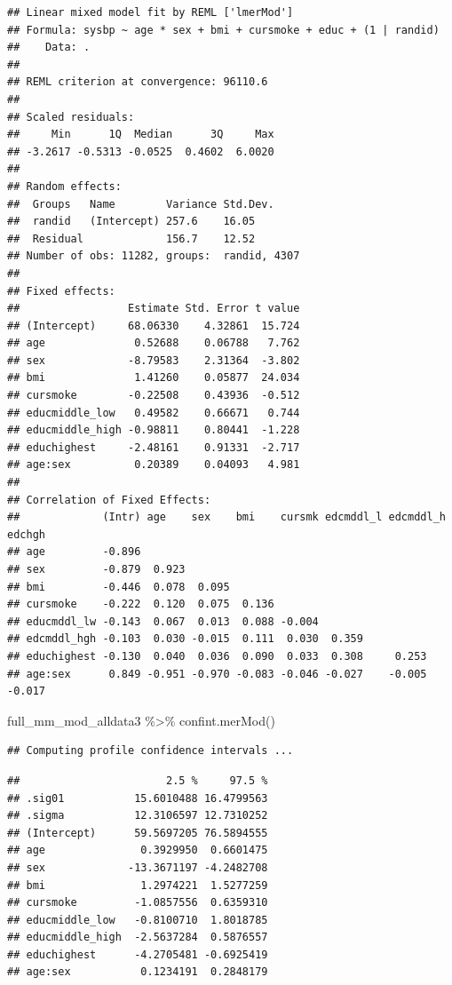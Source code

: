 \documentclass[
]{book}
\newenvironment{Shaded}{\begin{snugshade}}{\end{snugshade}}
\newcommand{\FunctionTok}[1]{\textcolor[rgb]{0.00,0.00,0.00}{#1}}
\newcommand{\NormalTok}[1]{#1}
\newcommand{\SpecialCharTok}[1]{\textcolor[rgb]{0.00,0.00,0.00}{#1}}
\begin{document}
\begin{verbatim}
## Linear mixed model fit by REML ['lmerMod']
## Formula: sysbp ~ age * sex + bmi + cursmoke + educ + (1 | randid)
##    Data: .
## 
## REML criterion at convergence: 96110.6
## 
## Scaled residuals: 
##     Min      1Q  Median      3Q     Max 
## -3.2617 -0.5313 -0.0525  0.4602  6.0020 
## 
## Random effects:
##  Groups   Name        Variance Std.Dev.
##  randid   (Intercept) 257.6    16.05   
##  Residual             156.7    12.52   
## Number of obs: 11282, groups:  randid, 4307
## 
## Fixed effects:
##                 Estimate Std. Error t value
## (Intercept)     68.06330    4.32861  15.724
## age              0.52688    0.06788   7.762
## sex             -8.79583    2.31364  -3.802
## bmi              1.41260    0.05877  24.034
## cursmoke        -0.22508    0.43936  -0.512
## educmiddle_low   0.49582    0.66671   0.744
## educmiddle_high -0.98811    0.80441  -1.228
## educhighest     -2.48161    0.91331  -2.717
## age:sex          0.20389    0.04093   4.981
## 
## Correlation of Fixed Effects:
##             (Intr) age    sex    bmi    cursmk edcmddl_l edcmddl_h edchgh
## age         -0.896                                                       
## sex         -0.879  0.923                                                
## bmi         -0.446  0.078  0.095                                         
## cursmoke    -0.222  0.120  0.075  0.136                                  
## educmddl_lw -0.143  0.067  0.013  0.088 -0.004                           
## edcmddl_hgh -0.103  0.030 -0.015  0.111  0.030  0.359                    
## educhighest -0.130  0.040  0.036  0.090  0.033  0.308     0.253          
## age:sex      0.849 -0.951 -0.970 -0.083 -0.046 -0.027    -0.005    -0.017
\end{verbatim}

\begin{Shaded}
\begin{Highlighting}[]
\NormalTok{full\_mm\_mod\_alldata3 }\SpecialCharTok{\%\textgreater{}\%} 
  \FunctionTok{confint.merMod}\NormalTok{()}
\end{Highlighting}
\end{Shaded}

\begin{verbatim}
## Computing profile confidence intervals ...
\end{verbatim}

\begin{verbatim}
##                       2.5 %     97.5 %
## .sig01           15.6010488 16.4799563
## .sigma           12.3106597 12.7310252
## (Intercept)      59.5697205 76.5894555
## age               0.3929950  0.6601475
## sex             -13.3671197 -4.2482708
## bmi               1.2974221  1.5277259
## cursmoke         -1.0857556  0.6359310
## educmiddle_low   -0.8100710  1.8018785
## educmiddle_high  -2.5637284  0.5876557
## educhighest      -4.2705481 -0.6925419
## age:sex           0.1234191  0.2848179
\end{verbatim}
\end{document}
